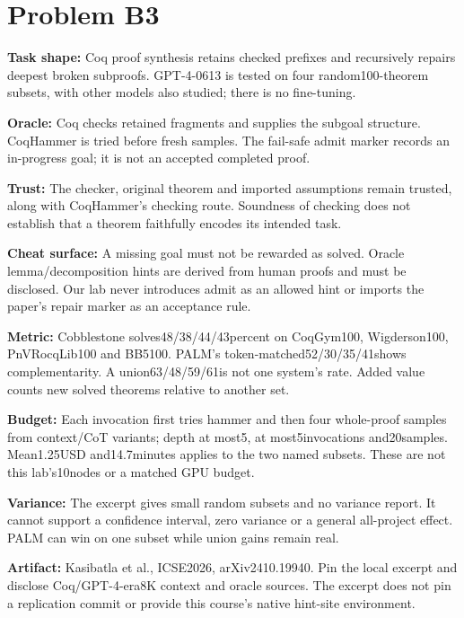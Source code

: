 \documentclass[11pt]{article}
\begin{document}
\section*{Problem B3}\label{ans:B3}
\begin{answer}
\textbf{Task shape:} Coq proof synthesis retains checked prefixes and recursively repairs deepest broken subproofs. GPT-4-0613 is tested on four random100-theorem subsets, with other models also studied; there is no fine-tuning.

\textbf{Oracle:} Coq checks retained fragments and supplies the subgoal structure. CoqHammer is tried before fresh samples. The fail-safe admit marker records an in-progress goal; it is not an accepted completed proof.

\textbf{Trust:} The checker, original theorem and imported assumptions remain trusted, along with CoqHammer's checking route. Soundness of checking does not establish that a theorem faithfully encodes its intended task.

\textbf{Cheat surface:} A missing goal must not be rewarded as solved. Oracle lemma/decomposition hints are derived from human proofs and must be disclosed. Our lab never introduces admit as an allowed hint or imports the paper's repair marker as an acceptance rule.

\textbf{Metric:} Cobblestone solves48/38/44/43percent on CoqGym100, Wigderson100, PnVRocqLib100 and BB5100. PALM's token-matched52/30/35/41shows complementarity. A union63/48/59/61is not one system's rate. Added value counts new solved theorems relative to another set.

\textbf{Budget:} Each invocation first tries hammer and then four whole-proof samples from context/CoT variants; depth at most5, at most5invocations and20samples. Mean1.25USD and14.7minutes applies to the two named subsets. These are not this lab's10nodes or a matched GPU budget.

\textbf{Variance:} The excerpt gives small random subsets and no variance report. It cannot support a confidence interval, zero variance or a general all-project effect. PALM can win on one subset while union gains remain real.

\textbf{Artifact:} Kasibatla et al., ICSE2026, arXiv2410.19940. Pin the local excerpt and disclose Coq/GPT-4-era8K context and oracle sources. The excerpt does not pin a replication commit or provide this course's native hint-site environment.

\end{answer}
\end{document}
